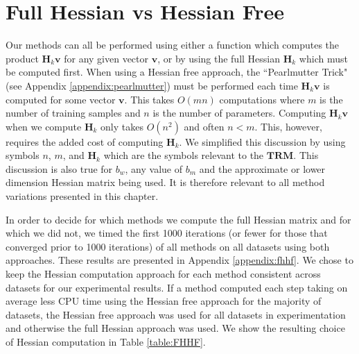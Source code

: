 \documentclass[letterpaper,12pt,titlepage,oneside,final]{book}
\begin{document}
	\section{Full Hessian vs Hessian Free}
	
	Our methods can all be performed using either a function which computes the product $\mathbf{H}_{k}\mathbf{v}$ for any given vector $\mathbf{v}$, or by using the full Hessian $\mathbf{H}_{k}$ which must be computed first. When using a Hessian free approach, the ``Pearlmutter Trick" (see Appendix \ref{appendix:pearlmutter}) must be performed each time $\mathbf{H}_{k}\mathbf{v}$ is computed for some vector $\mathbf{v}$. This takes $O(mn)$ computations where $m$ is the number of training samples and $n$ is the number of parameters. Computing $\mathbf{H}_{k}\mathbf{v}$ when we compute $\mathbf{H}_{k}$ only takes $O(n^{2})$ and often $n < m$. This, however, requires the added cost of computing $\mathbf{H}_{k}$. We simplified this discussion by using symbols $n$, $m$, and $\mathbf{H}_{k}$ which are the symbols relevant to the $\mathbf{TRM}$. This discussion is also true for $b_{w}$, any value of $b_{m}$ and the approximate or lower dimension Hessian matrix being used. It is therefore relevant to all method variations presented in this chapter.
	
	In order to decide for which methods we compute the full Hessian matrix and for which we did not, we timed the first 1000 iterations (or fewer for those that converged prior to 1000 iterations) of all methods on all datasets using both approaches. These results are presented in Appendix \ref{appendix:fhhf}.  We chose to keep the Hessian computation approach for each method consistent across datasets for our experimental results. If a method computed each step taking on average less CPU time using the Hessian free approach for the majority of datasets, the Hessian free approach was used for all datasets in experimentation and otherwise the full Hessian approach was used. We show the resulting choice of Hessian computation in Table \ref{table:FHHF}. 
	
\end{document}
